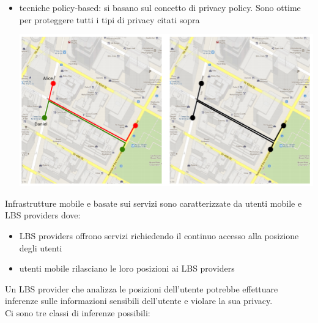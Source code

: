 \begin{itemize}
    \item tecniche policy-based: si basano sul concetto di privacy policy. Sono ottime per proteggere tutti i tipi di privacy citati sopra
    \begin{center}
    \includegraphics[scale=0.7]{img/pathloc.png}
\end{center}
\end{itemize}
Infrastrutture mobile e basate sui servizi sono caratterizzate da utenti mobile e LBS providers dove:
\begin{itemize}
    \item LBS providers offrono servizi richiedendo il continuo accesso alla posizione degli utenti
    \item utenti mobile rilasciano le loro posizioni ai LBS providers
\end{itemize}
Un LBS provider che analizza le posizioni dell'utente potrebbe effettuare inferenze sulle informazioni sensibili dell'utente e violare la sua privacy.\\
Ci sono tre classi di inferenze possibili:

